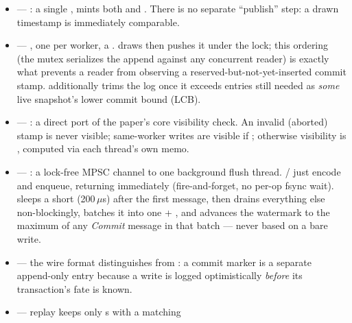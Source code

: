 \documentclass[11pt]{article}
\begin{document}
\begin{itemize}
  \item {} --- : a single
        ,  mints both 
        and . There is no separate ``publish'' step: a drawn timestamp
        is immediately comparable.
  \item {} --- , one per worker, a
        .  draws  then pushes
        it under the lock; this ordering (the mutex serializes the append against any
        concurrent reader) is exactly what prevents a reader from observing a
        reserved-but-not-yet-inserted commit stamp.  additionally
        trims the log once it exceeds  entries still needed as
        \emph{some} live snapshot's lower commit bound (LCB).
  \item {} --- : a direct port of the
        paper's core visibility check. An invalid (aborted) stamp is never visible;
        same-worker writes are visible if ;
        otherwise visibility is , computed via each thread's own  memo.
  \item {} --- : a lock-free MPSC channel to one
        background flush thread. / just encode
        and enqueue, returning immediately (fire-and-forget, no per-op fsync wait).
         sleeps a short  (200\,$\mu$s)
        after the first message, then drains everything else non-blockingly, batches it
        into one  + , and advances the
         watermark to the maximum  of any \emph{Commit}
        message in that batch --- never based on a bare write.
  \item {} --- the wire format distinguishes
         from : a
        commit marker is a separate append-only entry because a write is logged
        optimistically \emph{before} its transaction's fate is known.
  \item {} --- replay keeps only s with a matching

\end{itemize}
\end{document}
